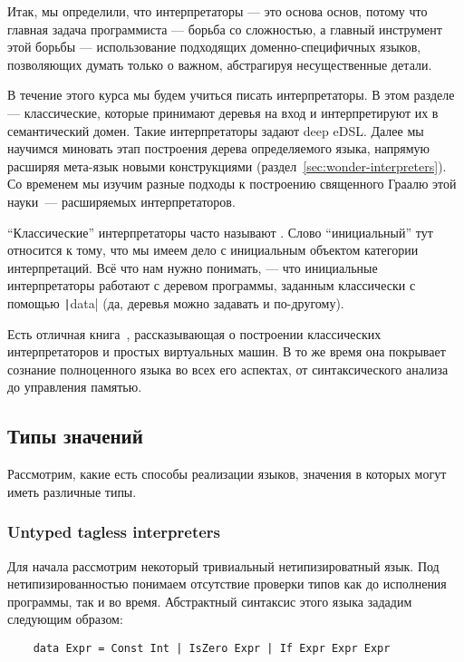 
Итак, мы определили, что интерпретаторы --- это основа основ, потому что главная задача программиста --- борьба со сложностью, а главный инструмент этой борьбы --- использование подходящих доменно-специфичных языков, позволяющих думать только о важном, абстрагируя несущественные детали.

В течение этого курса мы будем учиться писать интерпретаторы.
В этом разделе --- классические, которые принимают деревья на вход и интерпретируют их в семантический домен.
Такие интерпретаторы задают deep eDSL\@.
Далее мы научимся миновать этап построения дерева определяемого языка, напрямую расширяя мета-язык новыми конструкциями (раздел~\ref{sec:wonder-interpreters}).
Со временем мы изучим разные подходы к построению священного Граалю этой науки~--- расширяемых интерпретаторов.

``Классические'' интерпретаторы часто называют .
Слово ``инициальный'' тут относится к тому, что мы имеем дело с инициальным объектом категории интерпретаций.
Всё что нам нужно понимать, --- что инициальные интерпретаторы работают с деревом программы, заданным классически с помощью \texttt|data| (да, деревья можно задавать и по-другому).

Есть отличная книга~\cite{nystrom2021crafting}, рассказывающая о построении классических интерпретаторов и простых виртуальных машин.
В то же время она покрывает сознание полноценного языка во всех его аспектах, от синтаксического анализа до управления памятью.

\subsection{Типы значений}

Рассмотрим, какие есть способы реализации языков, значения в которых могут иметь различные типы.

\subsubsection{Untyped tagless interpreters}

Для начала рассмотрим некоторый тривиальный нетипизироватный язык.
Под нетипизированностью понимаем отсутствие проверки типов как до исполнения программы, так и во время.
Абстрактный синтаксис этого языка зададим следующим образом:
\begin{verbatim}
    data Expr = Const Int | IsZero Expr | If Expr Expr Expr
\end{verbatim}

